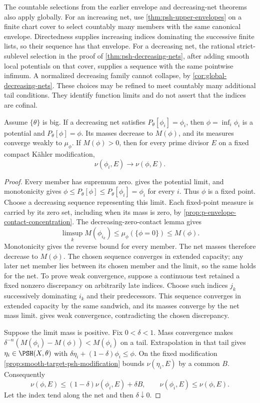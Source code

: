 The countable selections from the earlier envelope and decreasing-net theorems also apply globally. For an increasing net, use \cref{thm:psh-upper-envelopes} on a finite chart cover to select countably many members with the same canonical envelope. Directedness supplies increasing indices dominating the successive finite lists, so their sequence has that envelope. For a decreasing net, the rational strict-sublevel selection in the proof of \cref{thm:psh-decreasing-nets}, after adding smooth local potentials on that cover, supplies a sequence with the same pointwise infimum. A normalized decreasing family cannot collapse, by \cref{cor:global-decreasing-nets}. These choices may be refined to meet countably many additional tail conditions. They identify function limits and do not assert that the indices are cofinal.

\begin{proposition}\label{prop:decreasing-model-mass-continuity}
Assume $\{\theta\}$ is big. If a decreasing net satisfies $P_\theta[\phi_i]=\phi_i$, then $\phi=\inf_i\phi_i$ is a potential and $P_\theta[\phi]=\phi$. Its masses decrease to $M(\phi)$, and its measures converge weakly to $\mu_\phi$. If $M(\phi)>0$, then for every prime divisor $E$ on a fixed compact K\"ahler modification,
\[
 \nu(\phi_i,E)\longrightarrow\nu(\phi,E).
\]
\end{proposition}
\begin{proof}
Every member has supremum zero.  gives the potential limit, and monotonicity gives
$\phi\leq P_\theta[\phi]\leq P_\theta[\phi_i]=\phi_i$ for every $i$. Thus $\phi$ is a fixed point. Choose a decreasing sequence representing this limit. Each fixed-point measure is carried by its zero set, including when its mass is zero, by \cref{prop:p-envelope-contact-concentration}. The decreasing-zero-contact lemma gives
\[
 \limsup_kM(\phi_{i_k})\leq\mu_\phi(\{\phi=0\})\leq M(\phi).
\]
Monotonicity gives the reverse bound for every member. The net masses therefore decrease to $M(\phi)$. The chosen sequence converges in extended capacity; any later net member lies between its chosen member and the limit, so the same holds for the net. To prove weak convergence, suppose a continuous test retained a fixed nonzero discrepancy on arbitrarily late indices. Choose such indices $j_k$ successively dominating $i_k$ and their predecessors. This sequence converges in extended capacity by the same sandwich, and its masses converge by the net mass limit.  gives weak convergence, contradicting the chosen discrepancy.

Suppose the limit mass is positive. Fix $0<\delta<1$. Mass convergence makes
$\delta^{-n}(M(\phi_i)-M(\phi))<M(\phi_i)$ on a tail. Extrapolation in that tail gives $\eta_i\in\PSH(X,\theta)$ with
$\delta\eta_i+(1-\delta)\phi_i\leq\phi$. On the fixed modification \cref{prop:smooth-target-psh-modification} bounds $\nu(\eta_i,E)$ by a common $B$. Consequently
\[
 \nu(\phi,E)\leq(1-\delta)\nu(\phi_i,E)+\delta B,
 \qquad \nu(\phi_i,E)\leq\nu(\phi,E).
\]
Let the index tend along the net and then $\delta\downarrow0$.
\end{proof}

